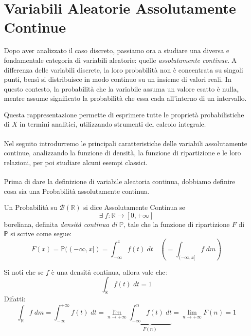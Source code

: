 \chapter{Variabili Aleatorie Assolutamente Continue}

Dopo aver analizzato il caso discreto, passiamo ora a studiare una diversa e fondamentale categoria di variabili aleatorie: quelle \emph{assolutamente continue}.  
A differenza delle variabili discrete, la loro probabilità non è concentrata su singoli punti, bensì si distribuisce in modo continuo su un insieme di valori reali.  
In questo contesto, la probabilità che la variabile assuma un valore esatto è nulla, mentre assume significato la probabilità che essa cada all’interno di un intervallo.

\medskip
\noindent Questa rappresentazione permette di esprimere tutte le proprietà probabilistiche di $X$ in termini analitici, utilizzando strumenti del calcolo integrale.\\
\\
Nel seguito introdurremo le principali caratteristiche delle variabili assolutamente continue, analizzando la funzione di densità, la funzione di ripartizione e le loro relazioni, per poi studiare alcuni esempi classici.\\
\\
Prima di dare la definizione di variabile aleatoria continua, dobbiamo definire cosa sia una Probabilità assolutamente continua.

\begin{definizione}
\label{def:9.1}
    Un Probabilità su $\mathcal{B}(\mathbb{R})$ si dice Assolutamente Continua se
    \[\exists\;f:\mathbb{R}\to [0, +\infty]\]
    boreliana, definita \textit{densità continua di }$\mathbb{P}$, tale che la funzione di ripartizione $F$ di $\mathbb{P}$ si scrive come segue:
    \[F(x) = \mathbb{P}((-\infty, x]) = \int_{-\infty}^x f(t)\;dt\quad\left(=\int_{(-\infty, x]}f\;dm\right)\]
\end{definizione}

\noindent Si noti che se $f$ è una densità continua, allora vale che:\[\boxed{\int_\mathbb{R}f(t)\;dt = 1}\]
Difatti:
\[\int_\mathbb{R}f\;dm = \int_{-\infty}^{+\infty}f(t)\;dt = \lim_{n\to+\infty}\underbrace{\int_{-\infty}^n f(t)\;dt}_{F(n)} = \lim_{n\to+\infty}F(n) = 1\]

